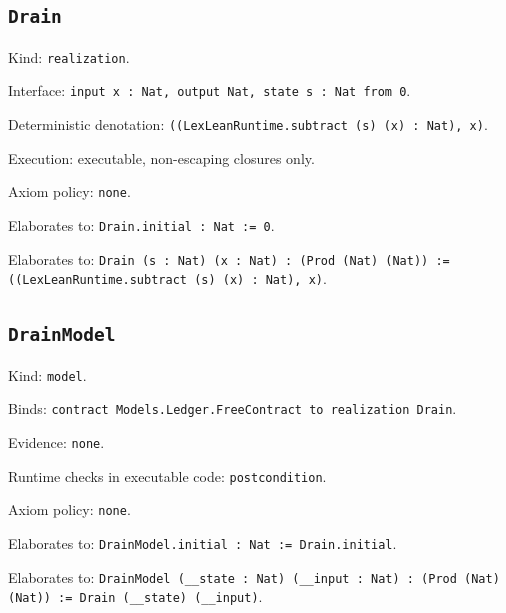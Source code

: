 \documentclass[11pt]{article}
\begin{document}
\subsection*{\texttt{Drain}}
\noindent Kind: \texttt{realization}.\par
\noindent Interface: \texttt{input x : Nat, output Nat, state s : Nat from 0}.\par
\noindent Deterministic denotation: \texttt{((LexLeanRuntime.subtract (s) (x) : Nat), x)}.\par
\noindent Execution: executable, non-escaping closures only.\par
\noindent Axiom policy: \texttt{none}.\par
\noindent Elaborates to: \texttt{Drain.initial : Nat := 0}.\par
\noindent Elaborates to: \texttt{Drain (s : Nat) (x : Nat) : (Prod (Nat) (Nat)) := ((LexLeanRuntime.subtract (s) (x) : Nat), x)}.\par
\subsection*{\texttt{DrainModel}}
\noindent Kind: \texttt{model}.\par
\noindent Binds: \texttt{contract Models.Ledger.FreeContract to realization Drain}.\par
\noindent Evidence: \texttt{none}.\par
\noindent Runtime checks in executable code: \texttt{postcondition}.\par
\noindent Axiom policy: \texttt{none}.\par
\noindent Elaborates to: \texttt{DrainModel.initial : Nat := Drain.initial}.\par
\noindent Elaborates to: \texttt{DrainModel (\_\_state : Nat) (\_\_input : Nat) : (Prod (Nat) (Nat)) := Drain (\_\_state) (\_\_input)}.\par
\end{document}
